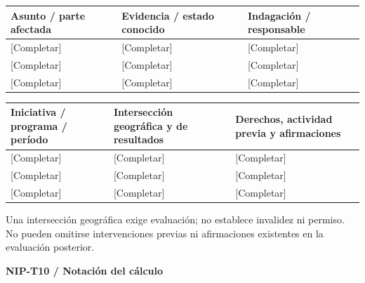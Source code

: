 {\sffamily\fontsize{8.3}{10.3}\selectfont\begin{longtable}{@{}P{56.09mm} P{51.14mm} P{57.74mm}@{}}
\toprule
\textbf{Asunto / parte afectada} & \textbf{Evidencia / estado conocido} & \textbf{Indagación / responsable}\\\midrule\endhead
\rule{0pt}{7.7mm}[Completar] & [Completar] & [Completar]\\\hline
\rule{0pt}{7.7mm}[Completar] & [Completar] & [Completar]\\\hline
\rule{0pt}{7.7mm}[Completar] & [Completar] & [Completar]\\\hline
\end{longtable}}
{\sffamily\fontsize{8.3}{10.3}\selectfont\begin{longtable}{@{}P{46.19mm} P{56.09mm} P{62.69mm}@{}}
\toprule
\textbf{Iniciativa / programa / período} & \textbf{Intersección geográfica y de resultados} & \textbf{Derechos, actividad previa y afirmaciones}\\\midrule\endhead
\rule{0pt}{7.7mm}[Completar] & [Completar] & [Completar]\\\hline
\rule{0pt}{7.7mm}[Completar] & [Completar] & [Completar]\\\hline
\rule{0pt}{7.7mm}[Completar] & [Completar] & [Completar]\\\hline
\end{longtable}}
\begin{Notice}Una intersección geográfica exige evaluación; no establece invalidez ni permiso. No pueden omitirse intervenciones previas ni afirmaciones existentes en la evaluación posterior.\end{Notice}
\par\begingroup\sffamily\fontsize{8}{10}\selectfont\color{NEBGreen}\setlength{\parskip}{2pt}\setlength{\abovedisplayskip}{4pt}\setlength{\belowdisplayskip}{4pt}\setlength{\abovedisplayshortskip}{2pt}\setlength{\belowdisplayshortskip}{3pt}
\textbf{NIP-T10 / Notación del cálculo}\par
